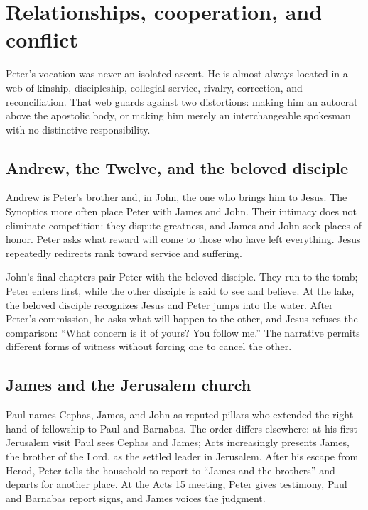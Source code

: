 \section{Relationships, cooperation, and conflict}\label{sec:peter-relations}

Peter's vocation was never an isolated ascent. He is almost always located in
a web of kinship, discipleship, collegial service, rivalry, correction, and
reconciliation. That web guards against two distortions: making him an
autocrat above the apostolic body, or making him merely an interchangeable
spokesman with no distinctive responsibility.

\subsection{Andrew, the Twelve, and the beloved disciple}

Andrew is Peter's brother and, in John, the one who brings him to Jesus. The
Synoptics more often place Peter with James and John. Their intimacy does not
eliminate competition: they dispute greatness, and James and John seek places
of honor. Peter asks what reward will come to those who have left everything.
Jesus repeatedly redirects rank toward service and suffering.

John's final chapters pair Peter with the beloved disciple. They run to the
tomb; Peter enters first, while the other disciple is said to see and believe.
At the lake, the beloved disciple recognizes Jesus and Peter jumps into the
water. After Peter's commission, he asks what will happen to the other, and
Jesus refuses the comparison: ``What concern is it of yours? You follow me.''
The narrative permits different forms of witness without forcing one to
cancel the other.

\subsection{James and the Jerusalem church}

Paul names Cephas, James, and John as reputed pillars who extended the right
hand of fellowship to Paul and Barnabas. The order differs elsewhere: at his
first Jerusalem visit Paul sees Cephas and James; Acts increasingly presents
James, the brother of the Lord, as the settled leader in Jerusalem. After his
escape from Herod, Peter tells the household to report to ``James and the
brothers'' and departs for another place. At the Acts 15 meeting, Peter gives
testimony, Paul and Barnabas report signs, and James voices the judgment.

